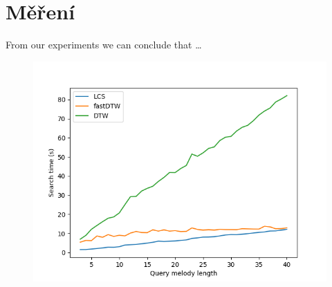 \section{Měření}

From our experiments we can conclude that \ldots

\begin{figure}
    \centering
    \includegraphics[width=\textwidth]{images/query_len.png}
\end{figure}